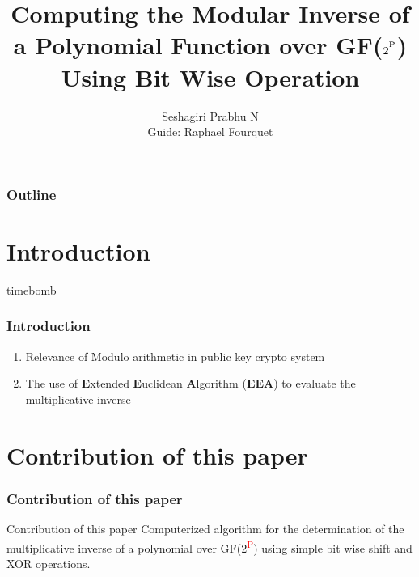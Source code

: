 \documentclass[12pt]{beamer}
\title{Computing the Modular Inverse of a Polynomial Function over GF($2^\textsuperscript{P}$)\\ Using Bit Wise Operation}
\author{Seshagiri Prabhu N 	\\ Guide: Raphael Fourquet}
\def\SP#1{\textsuperscript{\textcolor{red}{#1}}}
\begin{document}
\frame{\titlepage}
\section*{}
\begin{frame}
  \frametitle{Outline}
  \tableofcontents[section=1,hidesubsections]
\end{frame}

\newcommand{\icon}[1]{\pgfimage[height=1em]{#1}}


\section{Introduction}

\begin{frame}{timebomb}
  \frametitle{Introduction}
	\begin{enumerate}
		\item Relevance of Modulo arithmetic in public key crypto system
		\item The use of \textbf{E}xtended \textbf{E}uclidean \textbf{A}lgorithm (\textbf{EEA}) to evaluate the multiplicative inverse
	\end{enumerate}
\end{frame}


\section{Contribution of this paper}
\begin{frame}
\frametitle{Contribution of this paper}
	\begin{block}{Contribution of this paper}
		Computerized algorithm for the determination of the multiplicative inverse of a polynomial over GF(2\SP{P}) using simple bit wise shift and XOR operations. 	
	\end{block}
\end{frame}
\end{document}
